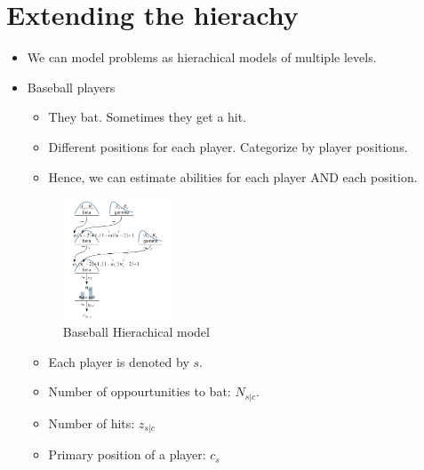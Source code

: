 \documentclass{article}
\begin{document}
\section{Extending the hierachy}
\begin{itemize}
    \item We can model problems as hierachical models of multiple levels.
    \item Baseball players
        \begin{itemize}
            \item They bat. Sometimes they get a hit. 
            \item Different positions for each player. Categorize by player positions.
            \item Hence, we can estimate abilities for each player AND each position.
        \end{itemize}
        \begin{figure}[H]
            \centering
            \includegraphics[width=0.3\textwidth]{baseball_model}
            \caption{Baseball Hierachical model}
            \label{fig:}
        \end{figure}
        \begin{itemize}
            \item Each player is denoted by $s$.
            \item Number of oppourtunities to bat: $N_{s|c}$.
            \item Number of hits: $z_{s|c}$
            \item Primary position of a player:  $c_{s}$
        \end{itemize}
\end{itemize}
\end{document}
